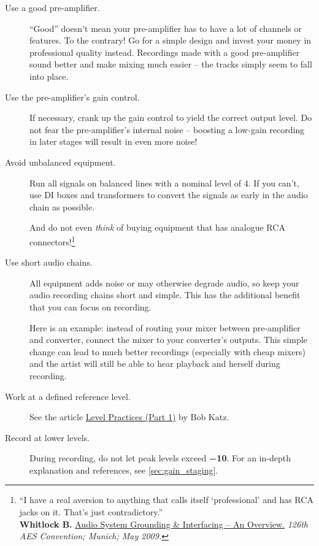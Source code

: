 \begin{description}

\item[Use a good pre-amplifier.]  ``Good'' doesn't mean your
  pre-amplifier has to have a lot of channels or features.  To the
  contrary!  Go for a simple design and invest your money in
  professional quality instead.  Recordings made with a good
  pre-amplifier sound better and make mixing much easier -- the tracks
  simply seem to fall into place.

\item[ Use the pre-amplifier's gain control.]  If necessary, crank up
  the gain control to yield the correct output level.  Do not fear the
  pre-amplifier's internal noise -- boosting a low-gain recording in
  later stages will result in even more noise!

\item[Avoid unbalanced equipment.]  Run all signals on balanced lines
  with a nominal level of \SI[retain-explicit-plus]{+4}{\dBu}.  If you
  can't, use DI boxes and transformers to convert the signals as early
  in the audio chain as possible.

  And do not even \emph{think} of buying equipment that has analogue
  RCA connectors!\footnote{``I have a real aversion to anything that
    calls itself `professional' and has RCA jacks on it.  That's just
    contradictory.'' \\
    \textbf{Whitlock B.}  \href{http://www.aes.org/live/?ID=218}{Audio
      System Grounding \& Interfacing -- An Overview.} \emph{126th AES
      Convention; Munich; May 2009.}}

\item[Use short audio chains.]  All equipment adds noise or may
  otherwise degrade audio, so keep your audio recording chains short
  and simple.  This has the additional benefit that you can focus on
  recording.

  Here is an example: instead of routing your mixer between
  pre-amplifier and converter, connect the mixer to your converter's
  outputs.  This simple change can lead to much better recordings
  (especially with cheap mixers) and the artist will still be able to
  hear playback and herself during recording.

\item[Work at a defined reference level.]  See the article
  \href{https://www.digido.com/portfolio-item/level-practices-part-1/}{Level
    Practices (Part 1)} by Bob Katz.

\item[Record at lower levels.]  During recording, do not let peak
  levels exceed \textbf{\SI{-10}{\dBFS}}.  For an in-depth explanation
  and references, see \ref{sec:gain_staging}.


\end{description}
